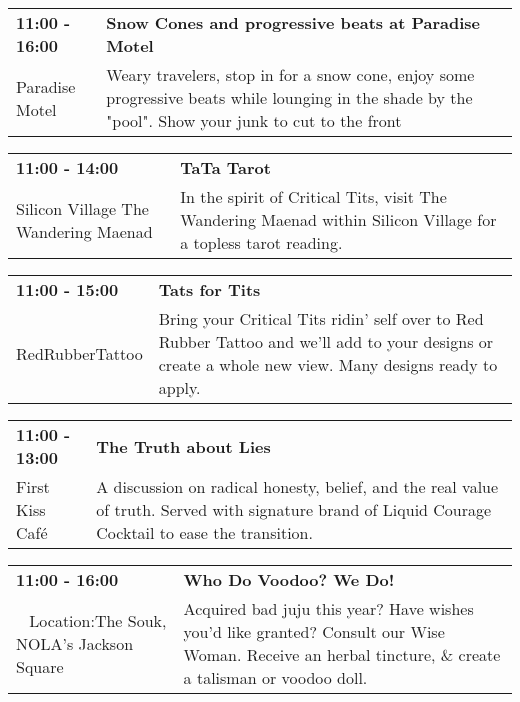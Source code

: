 \begin{tabular}{ p{1in} p{2.2in} }
    \textbf{11:00 - 16:00} & \textbf{Snow Cones and progressive beats at Paradise Motel} \\
    Paradise Motel \newline  & Weary travelers, stop in for a snow cone, enjoy some progressive beats while lounging in the shade by the "pool".   Show your junk to cut to the front \\
    \hline 
\end{tabular}
    
\begin{tabular}{ p{1in} p{2.2in} }
    \textbf{11:00 - 14:00} & \textbf{TaTa Tarot} \\
    Silicon Village \newline The Wandering Maenad & In the spirit of Critical Tits, visit The Wandering Maenad within Silicon Village for a topless tarot reading. \\
    \hline 
\end{tabular}
    
\begin{tabular}{ p{1in} p{2.2in} }
    \textbf{11:00 - 15:00} & \textbf{Tats for Tits} \\
    RedRubberTattoo \newline  & Bring your Critical Tits ridin' self over to Red Rubber Tattoo and we'll add to your designs or create a whole new view. Many designs ready to apply. \\
    \hline 
\end{tabular}
    
\begin{tabular}{ p{1in} p{2.2in} }
    \textbf{11:00 - 13:00} & \textbf{The Truth about Lies} \\
    First Kiss Caf\'e \newline  & A discussion on radical honesty, belief, and the real value of truth. Served with signature brand of Liquid Courage Cocktail to ease the transition. \\
    \hline 
\end{tabular}
    
\begin{tabular}{ p{1in} p{2.2in} }
    \textbf{11:00 - 16:00} & \textbf{Who Do Voodoo? We Do!} \\
    ~ \newline Location:The Souk, NOLA's Jackson Square  & Acquired bad juju this year? Have wishes you'd like granted? Consult our Wise Woman. Receive an herbal tincture, \& create a talisman or voodoo doll. \\
    \hline 
\end{tabular}
    
